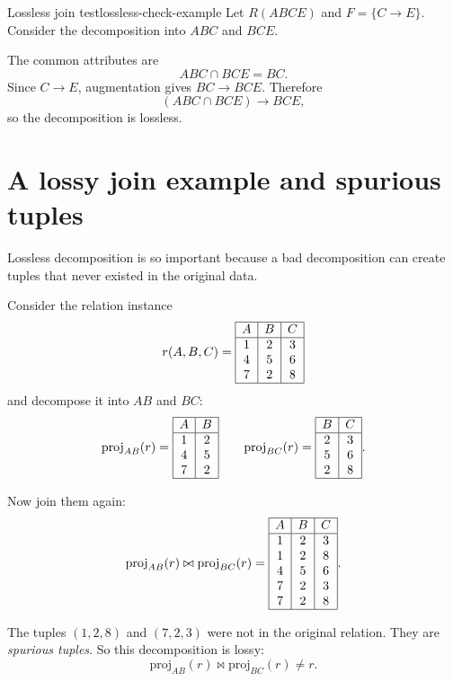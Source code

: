 \documentclass[11pt,a4paper,openany]{book}
\newcommand{\proj}{\mathrm{proj}}
\begin{document}
\begin{example}{Lossless join test}{lossless-check-example}
Let \(R(ABCE)\) and \(F=\{C\to E\}\). Consider the decomposition into \(ABC\) and \(BCE\).

The common attributes are
\[
ABC \cap BCE = BC.
\]
Since \(C\to E\), augmentation gives \(BC\to BCE\). Therefore
\[
(ABC\cap BCE)\to BCE,
\]
so the decomposition is lossless.
\end{example}

\section{A lossy join example and spurious tuples}
Lossless decomposition is so important because a bad decomposition can create tuples that never existed in the original data.

Consider the relation instance
\[
r(A,B,C)=
\begin{array}{|c|c|c|}\hline
A&B&C\\\hline
1&2&3\\
4&5&6\\
7&2&8\\\hline
\end{array}
\]
and decompose it into \(AB\) and \(BC\):
\[
\proj_{AB}(r)=
\begin{array}{|c|c|}\hline
A&B\\\hline
1&2\\
4&5\\
7&2\\\hline
\end{array}
\qquad
\proj_{BC}(r)=
\begin{array}{|c|c|}\hline
B&C\\\hline
2&3\\
5&6\\
2&8\\\hline
\end{array}.
\]

Now join them again:
\[
\proj_{AB}(r)\bowtie\proj_{BC}(r)=
\begin{array}{|c|c|c|}\hline
A&B&C\\\hline
1&2&3\\
1&2&8\\
4&5&6\\
7&2&3\\
7&2&8\\\hline
\end{array}.
\]

The tuples \((1,2,8)\) and \((7,2,3)\) were not in the original relation. They are \emph{spurious tuples}. So this decomposition is lossy:
\[
\proj_{AB}(r)\bowtie\proj_{BC}(r)\neq r.
\]
\end{document}

